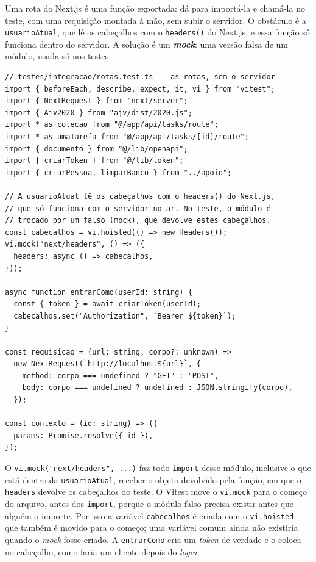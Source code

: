 Uma rota do Next.js é uma função exportada: dá para importá-la e chamá-la no teste, com uma requisição montada à mão, sem subir o servidor. O obstáculo é a \texttt{usuarioAtual}, que lê os cabeçalhos com o \texttt{headers()} do Next.js, e essa função só funciona dentro do servidor. A solução é um \textbf{\textit{mock}}: uma versão falsa de um módulo, usada só nos testes.

\begin{codigo}
\begin{Verbatim}[breaklines=true, breaksymbolleft={}, fontsize=\footnotesize]
// testes/integracao/rotas.test.ts -- as rotas, sem o servidor
import { beforeEach, describe, expect, it, vi } from "vitest";
import { NextRequest } from "next/server";
import { Ajv2020 } from "ajv/dist/2020.js";
import * as colecao from "@/app/api/tasks/route";
import * as umaTarefa from "@/app/api/tasks/[id]/route";
import { documento } from "@/lib/openapi";
import { criarToken } from "@/lib/token";
import { criarPessoa, limparBanco } from "../apoio";

// A usuarioAtual lê os cabeçalhos com o headers() do Next.js,
// que só funciona com o servidor no ar. No teste, o módulo é
// trocado por um falso (mock), que devolve estes cabeçalhos.
const cabecalhos = vi.hoisted(() => new Headers());
vi.mock("next/headers", () => ({
  headers: async () => cabecalhos,
}));

async function entrarComo(userId: string) {
  const { token } = await criarToken(userId);
  cabecalhos.set("Authorization", `Bearer ${token}`);
}

const requisicao = (url: string, corpo?: unknown) =>
  new NextRequest(`http://localhost${url}`, {
    method: corpo === undefined ? "GET" : "POST",
    body: corpo === undefined ? undefined : JSON.stringify(corpo),
  });

const contexto = (id: string) => ({
  params: Promise.resolve({ id }),
});
\end{Verbatim}
\end{codigo}

O \texttt{vi.mock("next/headers", ...)} faz todo \texttt{import} desse módulo, inclusive o que está dentro da \texttt{usuarioAtual}, receber o objeto devolvido pela função, em que o \texttt{headers} devolve os cabeçalhos do teste. O Vitest move o \texttt{vi.mock} para o começo do arquivo, antes dos \texttt{import}, porque o módulo falso precisa existir antes que alguém o importe. Por isso a variável \texttt{cabecalhos} é criada com o \texttt{vi.hoisted}, que também é movido para o começo; uma variável comum ainda não existiria quando o \textit{mock} fosse criado. A \texttt{entrarComo} cria um \textit{token} de verdade e o coloca no cabeçalho, como faria um cliente depois do \textit{login}.

